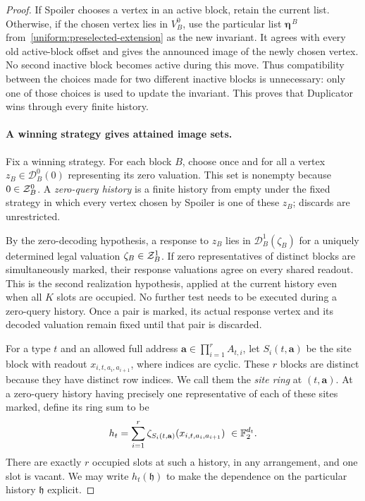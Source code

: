 \begin{proof}
If Spoiler chooses a vertex in an active block, retain the current list.
Otherwise, if the chosen vertex lies in $V_B^0$, use the particular list
$\boldsymbol\eta^{\,B}$ from~\eqref{uniform:preselected-extension} as the
new invariant.  It agrees with every old active-block offset and gives the
announced image of the newly chosen vertex.  No second inactive block
becomes active during this move.  Thus compatibility between the choices
made for two different inactive blocks is unnecessary: only one of those
choices is used to update the invariant.  This proves that Duplicator wins
through every finite history.

\paragraph{A winning strategy gives attained image sets.}
Fix a winning strategy.  For each block \(B\), choose once and for all a
vertex \(z_B\in\mathcal D_B^0(0)\) representing its zero valuation.
This set is nonempty because \(0\in\mathcal Z_B^0\).  A
\emph{zero-query history} is a finite history from empty under the fixed
strategy in which every vertex chosen by Spoiler is one of these $z_B$;
discards are unrestricted.

By the zero-decoding hypothesis, a response to \(z_B\) lies in
\(\mathcal D_B^1(\zeta_B)\) for a uniquely determined legal valuation
$\zeta_B\in\mathcal Z_B^1$.  If zero representatives of distinct blocks are
simultaneously marked, their response valuations agree on every shared
readout. This is the second realization hypothesis, applied at the
current history even when all $K$ slots are occupied. No further test
needs to be executed during a zero-query history. Once a pair is marked,
its actual response vertex and its decoded valuation remain fixed until
that pair is discarded.

For a type $t$ and an allowed full address
$\mathbf a\in\prod_{i=1}^r A_{t,i}$, let
$S_i(t,\mathbf a)$ be the site block with readout
$x_{i,t,a_i,a_{i+1}}$, where indices are cyclic.  These $r$ blocks are
distinct because they have distinct row indices.  We call them the
\emph{site ring} at $(t,\mathbf a)$.  At a zero-query history having
precisely one representative of each of these sites marked, define its
ring sum to be
\begin{equation}
\label{uniform:ring-sum}
 h_t=\sum_{i=1}^r
 \zeta_{S_i(t,\mathbf a)}(x_{i,t,a_i,a_{i+1}})
 \ \in\mathbb F_2^{d_t}.
\end{equation}
There are exactly $r$ occupied slots at such a history, in any arrangement,
and one slot is vacant.  We may write $h_t(\mathfrak h)$ to make the
dependence on the particular history $\mathfrak h$ explicit.


\end{proof}
